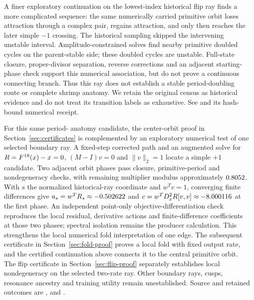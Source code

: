\documentclass[11pt,letterpaper]{article}
\begin{document}
A finer exploratory continuation on the lowest-index historical flip ray finds a more complicated sequence: the same numerically carried primitive orbit loses attraction through a complex pair, regains attraction, and only then reaches the later simple $-1$ crossing. The historical sampling skipped the intervening unstable interval. Amplitude-constrained solves find nearby primitive doubled cycles on the parent-stable side; these doubled cycles are unstable. Full-state closure, proper-divisor separation, reverse corrections and an adjacent starting-phase check support this numerical association, but do not prove a continuous connecting branch. Thus this ray does not establish a stable period-doubling route or complete shrimp anatomy. We retain the original census as historical evidence and do not treat its transition labels as exhaustive. See  and its hash-bound numerical receipt.

\begin{samepage}
For this same period-\nPEighteenPeriod{} anatomy candidate, the center-orbit proof in
Section~\ref{sec:certificates} is complemented by an exploratory numerical test of one selected boundary ray.
A fixed-step corrected path and an augmented solve for $R=F^{18}(x)-x=0$, $(M-I)v=0$ and $\|v\|_2=1$
locate a simple $+1$ candidate. Two adjacent orbit phases pass closure, primitive-period and nondegeneracy
checks, with remaining multiplier modulus approximately $0.8052$.
With $s$ the normalized historical-ray coordinate and $w^Tv=1$, converging finite differences give
$a_s=w^TR_s\approx-0.502622$ and $c=w^TD_x^2R[v,v]\approx-8.000116$ at the first phase.
An independent point-only objective-differentiation check reproduces the local residual, derivative actions and
finite-difference coefficients at those two phases; spectral isolation remains the producer calculation.
This strengthens the local numerical fold interpretation of one edge. The subsequent certificate in
Section~\ref{sec:fold-proof} proves a local fold with fixed output rate, and the certified continuation above connects it to the central primitive orbit. The flip certificate in Section~\ref{sec:flip-proof} separately establishes local nondegeneracy on the selected two-rate ray. Other boundary rays, cusps, resonance ancestry
and training utility remain unestablished. Source and retained outcomes are
,  and
.
\par\end{samepage}
\end{document}
